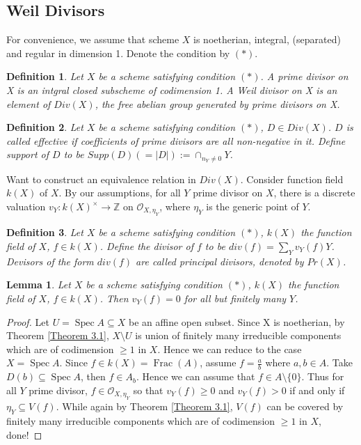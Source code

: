 \documentclass{ctexart}
\newtheorem{definition}{Definition}[section]
\newtheorem{lemma}{Lemma}[section]
\newcommand{\spec}{\operatorname{Spec}}
\newcommand{\fraction}{\operatorname{Frac}}
\begin{document}
\subsection{Weil Divisors}
For convenience, we assume that scheme $X$ is noetherian, integral, (separated) and regular in dimension 1.
Denote the condition by $(\ast)$.
\begin{definition}
    Let $X$ be a scheme satisfying condition $(\ast)$.
    A prime divisor on X is an intgral closed subscheme of codimension 1.
    A Weil divisor on X is an element of $Div(X)$, the free abelian group generated by prime divisors on X.
\end{definition}
\begin{definition}
    Let $X$ be a scheme satisfying condition $(\ast)$, $D\in Div(X)$.
    $D$ is called effective if coefficients of prime divisors are all non-negative in it.
    Define support of $D$ to be $Supp(D) (= |D|) := \cap_{n_{Y} \neq 0} Y$.
\end{definition}
Want to construct an equivalence relation in $Div(X)$.
Consider function field $k(X)$ of $X$.
By our assumptions, for all $Y$ prime divisor on $X$, there is a discrete valuation $v_{Y}: k(X)^{\times} \longrightarrow \mathbb{Z}$ on $\mathcal{O}_{X, \eta_{Y}}$,
where $\eta_{Y}$ is the generic point of $Y$.
\begin{definition}
    Let $X$ be a scheme satisfying condition $(\ast)$, $k(X)$ the function field of $X$, $f\in k(X)$.
    Define the divisor of $f$ to be $div(f) = \sum_{Y} v_{Y}(f)Y$.
    Devisors of the form $div(f)$ are called principal divisors, denoted by $Pr(X)$.
\end{definition}
\begin{lemma}
    Let $X$ be a scheme satisfying condition $(\ast)$, $k(X)$ the function field of $X$, $f\in k(X)$.
    Then $v_{Y}(f) = 0$ for all but finitely many $Y$.
    \label{Lemma 8.1}
\end{lemma}
\begin{proof}
    Let $U = \spec A \subseteq X$ be an affine open subset.
    Since X is noetherian, by Theorem \ref{Theorem 3.1}, $X \setminus U$ is union of finitely many irreducible components which are of codimension $\ge 1$ in $X$.
    Hence we can reduce to the case $X = \spec A$.
    Since $f\in k(X) = \fraction(A)$, assume $f = \frac{a}{b}$ where $a,b\in A$.
    Take $D(b) \subseteq \spec A$, then $f\in A_{b}$.
    Hence we can assume that $f\in A \setminus \{0\}$.
    Thus for all $Y$ prime divisor, $f\in \mathcal{O}_{X, \eta_{Y}}$ so that $v_{Y}(f) \ge 0$ and $v_{Y}(f) > 0$ if and only if $\eta_{Y} \subseteq V(f)$.
    While again by Theorem \ref{Theorem 3.1}, $V(f)$ can be covered by finitely many irreducible components which are of codimension $\ge 1$ in $X$, done!
\end{proof}
\end{document}
